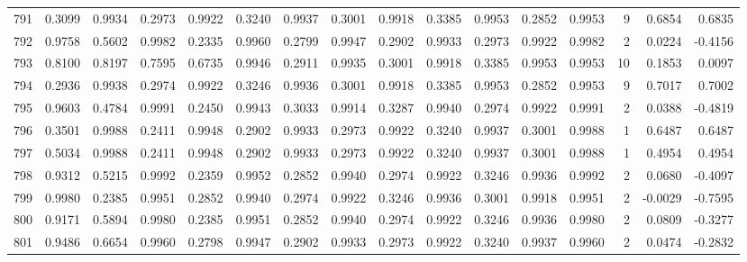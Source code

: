 \begin{tabular}{lrrrrrrrrrrrrrrr}
791 &      0.3099 &  0.9934 &  0.2973 &  0.9922 &  0.3240 &  0.9937 &  0.3001 &  0.9918 &  0.3385 &  0.9953 &   0.2852 &     0.9953 &      9 &                    0.6854 &                     0.6835 \\
792 &      0.9758 &  0.5602 &  0.9982 &  0.2335 &  0.9960 &  0.2799 &  0.9947 &  0.2902 &  0.9933 &  0.2973 &   0.9922 &     0.9982 &      2 &                    0.0224 &                    -0.4156 \\
793 &      0.8100 &  0.8197 &  0.7595 &  0.6735 &  0.9946 &  0.2911 &  0.9935 &  0.3001 &  0.9918 &  0.3385 &   0.9953 &     0.9953 &     10 &                    0.1853 &                     0.0097 \\
794 &      0.2936 &  0.9938 &  0.2974 &  0.9922 &  0.3246 &  0.9936 &  0.3001 &  0.9918 &  0.3385 &  0.9953 &   0.2852 &     0.9953 &      9 &                    0.7017 &                     0.7002 \\
795 &      0.9603 &  0.4784 &  0.9991 &  0.2450 &  0.9943 &  0.3033 &  0.9914 &  0.3287 &  0.9940 &  0.2974 &   0.9922 &     0.9991 &      2 &                    0.0388 &                    -0.4819 \\
796 &      0.3501 &  0.9988 &  0.2411 &  0.9948 &  0.2902 &  0.9933 &  0.2973 &  0.9922 &  0.3240 &  0.9937 &   0.3001 &     0.9988 &      1 &                    0.6487 &                     0.6487 \\
797 &      0.5034 &  0.9988 &  0.2411 &  0.9948 &  0.2902 &  0.9933 &  0.2973 &  0.9922 &  0.3240 &  0.9937 &   0.3001 &     0.9988 &      1 &                    0.4954 &                     0.4954 \\
798 &      0.9312 &  0.5215 &  0.9992 &  0.2359 &  0.9952 &  0.2852 &  0.9940 &  0.2974 &  0.9922 &  0.3246 &   0.9936 &     0.9992 &      2 &                    0.0680 &                    -0.4097 \\
799 &      0.9980 &  0.2385 &  0.9951 &  0.2852 &  0.9940 &  0.2974 &  0.9922 &  0.3246 &  0.9936 &  0.3001 &   0.9918 &     0.9951 &      2 &                   -0.0029 &                    -0.7595 \\
800 &      0.9171 &  0.5894 &  0.9980 &  0.2385 &  0.9951 &  0.2852 &  0.9940 &  0.2974 &  0.9922 &  0.3246 &   0.9936 &     0.9980 &      2 &                    0.0809 &                    -0.3277 \\
801 &      0.9486 &  0.6654 &  0.9960 &  0.2798 &  0.9947 &  0.2902 &  0.9933 &  0.2973 &  0.9922 &  0.3240 &   0.9937 &     0.9960 &      2 &                    0.0474 &                    -0.2832 \\

\end{tabular}
